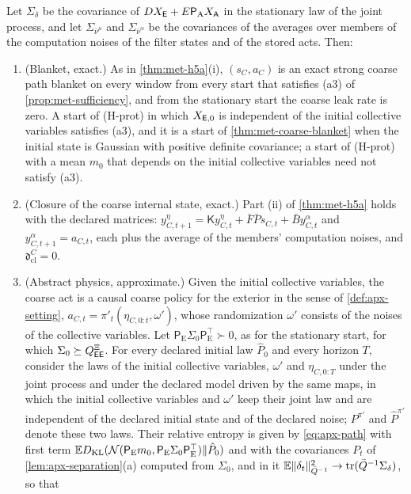 \begin{theorem}
\begin{enumerate}
\end{enumerate}
Let $\Sigma_\delta$ be the covariance of $DX_{\mathsf{E}}+E\mathsf P_{\mathrm A}X_{\mathsf{A}}$ in the stationary law of the joint process, and let $\Sigma_{\bar\nu^\mu}$ and $\Sigma_{\bar\nu^\alpha}$ be the covariances of the averages over members of the computation noises of the filter states and of the stored acts. Then:
\begin{enumerate}
\item[(i)] (Blanket, exact.) As in \cref{thm:met-h5a}(i), $(s_C,a_C)$ is an exact strong coarse path blanket on every window from every start that satisfies (a3) of \cref{prop:met-sufficiency}, and from the stationary start the coarse leak rate is zero. A start of (H-prot) in which $X_{\mathsf{E},0}$ is independent of the initial collective variables satisfies (a3), and it is a start of \cref{thm:met-coarse-blanket} when the initial state is Gaussian with positive definite covariance; a start of (H-prot) with a mean $m_0$ that depends on the initial collective variables need not satisfy (a3).
\item[(ii)] (Closure of the coarse internal state, exact.) Part (ii) of \cref{thm:met-h5a} holds with the declared matrices: $y^\eta_{C,t+1}=\mathsf Ky^\eta_{C,t}+\bar F\bar Ps_{C,t}+\bar By^\alpha_{C,t}$ and $y^\alpha_{C,t+1}=a_{C,t}$, each plus the average of the members' computation noises, and $\mathfrak d^C_{\mathrm{cl}}=0$.
\item[(iii)] (Abstract physics, approximate.) Given the initial collective variables, the coarse act is a causal coarse policy for the exterior in the sense of \cref{def:apx-setting}, $a_{C,t}=\pi'_t(\eta_{C,0:t},\omega')$, whose randomization $\omega'$ consists of the noises of the collective variables. Let $\mathsf P_{\mathrm E}\Sigma_0\mathsf P_{\mathrm E}^\top\succ0$, as for the stationary start, for which $\Sigma_0\succeq Q^{\Xi}_{\mathsf{E}\mathsf{E}}$. For every declared initial law $\hat P_0$ and every horizon $T$, consider the laws of the initial collective variables, $\omega'$ and $\eta_{C,0:T}$ under the joint process and under the declared model driven by the same maps, in which the initial collective variables and $\omega'$ keep their joint law and are independent of the declared initial state and of the declared noise; $P^{\pi'}$ and $\hat P^{\pi'}$ denote these two laws. Their relative entropy is given by \eqref{eq:apx-path} with first term $\mathbb{E}D_{\mathrm{KL}}(\mathcal{N}(\mathsf P_{\mathrm E}m_0,\mathsf P_{\mathrm E}\Sigma_0\mathsf P_{\mathrm E}^\top)\Vert\hat P_0)$ and with the covariances $P_t$ of \cref{lem:apx-separation}(a) computed from $\Sigma_0$, and in it $\mathbb{E}\Vert\delta_t\Vert^2_{\bar Q^{-1}}\to\operatorname{tr}(\bar Q^{-1}\Sigma_\delta)$, so that

\end{enumerate}
\end{theorem}
